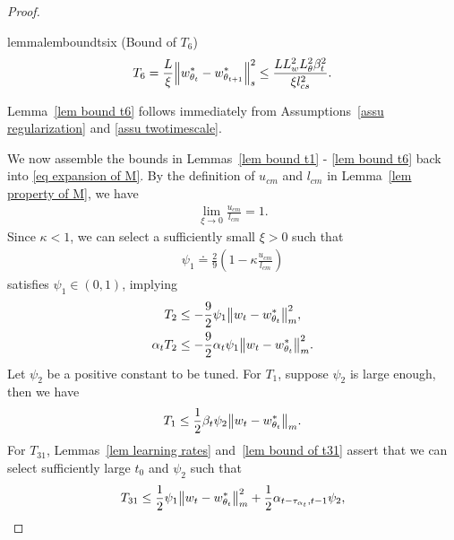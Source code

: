 \documentclass[twoside,11pt]{article}
\numberwithin{assucounter}{section}
\begin{document}
\begin{proof}
\begin{restatable}{lemma}{lemboundtsix}
  \label{lem bound t6}
  (Bound of $T_6$)
  \begin{align}
      T_6 = \frac{L}{\xi} \norm{w^*_{\theta_t} - w^*_{\theta_{t+1}}}_s^2 \leq \frac{L L_w^2 L_\theta^2 \beta_t^2}{\xi l_{cs}^2}.
  \end{align}
\end{restatable}
\noindent
Lemma~\ref{lem bound t6} follows immediately from Assumptions~\ref{assu regularization} and \ref{assu twotimescale}.

We now assemble the bounds in Lemmas~\ref{lem bound t1} - \ref{lem bound t6} back into \eqref{eq expansion of M}.
By the definition of $u_{cm}$ and $l_{cm}$ in Lemma~\ref{lem property of M},
we have
\begin{align}
  \lim_{\xi \to 0} \frac{u_{cm}}{l_{cm}} = 1.
\end{align}
Since $\kappa < 1$,
we can select a sufficiently small $\xi > 0$ such that
\begin{align}
  \psi_1 \doteq \frac{2}{9} (1 - \kappa \frac{u_{cm}}{l_{cm}})
\end{align}
satisfies $\psi_1 \in (0, 1)$,
implying 
\begin{align}
  T_2 &\leq -\frac{9}{2} \psi_1 \norm{w_t - w^*_{\theta_t}}_m^2, \\
  \label{eq simple t2}
  \alpha_t T_2 &\leq -\frac{9}{2} \alpha_t \psi_1 \norm{w_t - w^*_{\theta_t}}_m^2.
\end{align}
Let $\psi_2$ be a positive constant to be tuned.
For $T_1$, suppose $\psi_2$ is large enough,
then we have
\begin{align}
  \label{eq simple t1}
  T_1 \leq \frac{1}{2} \beta_t \psi_2 \norm{w_t - w^*_{\theta_t}}_m.
\end{align}
For $T_{31}$,
Lemmas~\ref{lem learning rates} and~\ref{lem bound of t31} assert that
we can select sufficiently large $t_0$ and $\psi_2$ such that
\begin{align}
  T_{31} &\leq \frac{1}{2} \psi_1 \norm{w_t - w^*_{\theta_t}}_m^2 + \frac{1}{2}\alpha_{t-\tau_{\alpha_t}, t-1} \psi_2, \\

\end{align}
\end{proof}
\end{document}

